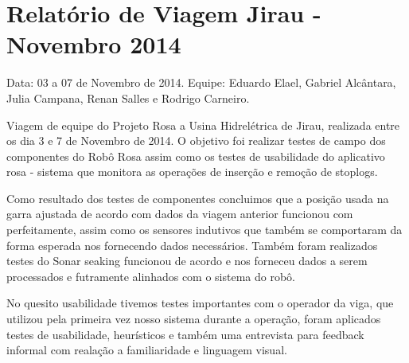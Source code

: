 \section{Relatório de Viagem Jirau - Novembro 2014}
Data: 03 a 07 de Novembro de 2014.
Equipe: Eduardo Elael, Gabriel Alcântara, Julia Campana, Renan Salles e Rodrigo Carneiro.


Viagem de equipe do Projeto Rosa a Usina Hidrelétrica de Jirau, realizada entre
os dia 3 e 7 de Novembro de 2014. O objetivo foi realizar testes de campo dos
componentes do Robô Rosa assim como os testes de usabilidade do aplicativo rosa
- sistema que monitora as operações de inserção e remoção de stoplogs.

Como resultado dos testes de componentes concluimos que a posição usada na
garra ajustada de acordo com dados da viagem anterior funcionou com
perfeitamente, assim como  os sensores indutivos que também se comportaram da
forma esperada nos fornecendo dados necessários.  Também foram realizados
testes do Sonar seaking funcionou de acordo e nos forneceu dados a serem
processados e futramente alinhados com o sistema do robô.

No quesito usabilidade tivemos testes importantes com o operador da viga, que
utilizou pela primeira vez nosso sistema durante a operação, foram aplicados
testes de usabilidade, heurísticos e também uma entrevista para feedback
informal com realação a familiaridade e linguagem visual.



